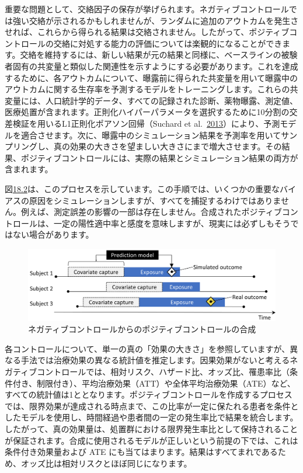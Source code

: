\documentclass[
  11pt]{book}
\theoremstyle{definition}
\theoremstyle{definition}
\theoremstyle{definition}
\theoremstyle{definition}
\theoremstyle{remark}
\begin{document}
重要な問題として、交絡因子の保存が挙げられます。ネガティブコントロールでは強い交絡が示されるかもしれませんが、ランダムに追加のアウトカムを発生させれば、これらから得られる結果は交絡されません。したがって、ポジティブコントロールの交絡に対処する能力の評価については楽観的になることができます。交絡を維持するには、新しい結果が元の結果と同様に、ベースラインの被験者固有の共変量と類似した関連性を示すようにする必要があります。これを達成するために、各アウトカムについて、曝露前に得られた共変量を用いて曝露中のアウトカムに関する生存率を予測するモデルをトレーニングします。これらの共変量には、人口統計学的データ、すべての記録された診断、薬物曝露、測定値、医療処置が含まれます。正則化ハイパーパラメータを選択するために10分割の交差検証を用いるL1正則化ポアソン回帰（Suchard et al.~\href{https://ohdsi.github.io/TheBookOfOhdsi/MethodValidity.html\#ref-suchard_2013}{2013}）により、予測モデルを適合させます。次に、曝露中のシミュレーション結果を予測率を用いてサンプリングし、真の効果の大きさを望ましい大きさにまで増大させます。その結果、ポジティブコントロールには、実際の結果とシミュレーション結果の両方が含まれます。

図\href{https://ohdsi.github.io/TheBookOfOhdsi/MethodValidity.html\#fig:posControlSynth}{18.2}は、このプロセスを示しています。この手順では、いくつかの重要なバイアスの原因をシミュレーションしますが、すべてを捕捉するわけではありません。例えば、測定誤差の影響の一部は存在しません。合成されたポジティブコントロールは、一定の陽性適中率と感度を意味しますが、現実には必ずしもそうではない場合があります。

\begin{figure}

{\centering \includegraphics[width=0.9\linewidth]{images/MethodValidity/posControlSynth} 

}

\caption{ネガティブコントロールからのポジティブコントロールの合成}\label{fig:posControlSynth}
\end{figure}

各コントロールについて、単一の真の「効果の大きさ」を参照していますが、異なる手法では治療効果の異なる統計値を推定します。因果効果がないと考えるネガティブコントロールでは、相対リスク、ハザード比、オッズ比、罹患率比（条件付き、制限付き）、平均治療効果（ATT）や全体平均治療効果（ATE）など、すべての統計値は1ととなります。ポジティブコントロールを作成するプロセスでは、限界効果が達成される時点まで、この比率が一定に保たれる患者を条件としたモデルを使用し、時間経過や患者間の一定の発生率比で結果を統合します。したがって、真の効果量は、処置群における限界発生率比として保持されることが保証されます。合成に使用されるモデルが正しいという前提の下では、これは条件付き効果量および ATE にも当てはまります。結果はすべてまれであるため、オッズ比は相対リスクとほぼ同じになります。
\end{document}
